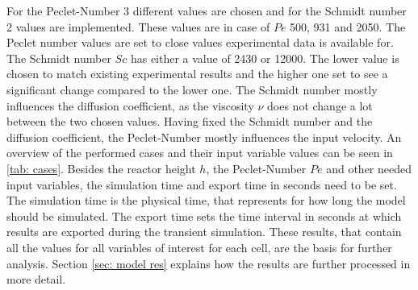 \documentclass[../thesis.tex]{subfiles}
\begin{document}
For the Peclet-Number 3 different values are chosen and for the Schmidt number 2 values are implemented. These values are in case of $Pe$ 500, 931 and 2050. The Peclet number values are set to close values experimental data is available for. The Schmidt number $Sc$ has either a value of 2430 or 12000. The lower value is chosen to match existing experimental results and the higher one set to see a significant change compared to the lower one. The Schmidt number mostly influences the diffusion coefficient, as the viscosity $\nu$ does not change a lot between the two chosen values. Having fixed the Schmidt number and the diffusion coefficient, the Peclet-Number mostly influences the input velocity. An overview of the performed cases and their input variable values can be seen in \autoref{tab: cases}. Besides the reactor height $h$, the Peclet-Number $Pe$ and other needed input variables, the simulation time and export time in seconds need to be set. The simulation time is the physical time, that represents for how long the model should be simulated. The export time sets the time interval in seconds at which results are exported during the transient simulation. These results, that contain all the values for all variables of interest for each cell, are the basis for further analysis. Section \ref{sec: model res} explains how the results are further processed in more detail.
\end{document}
